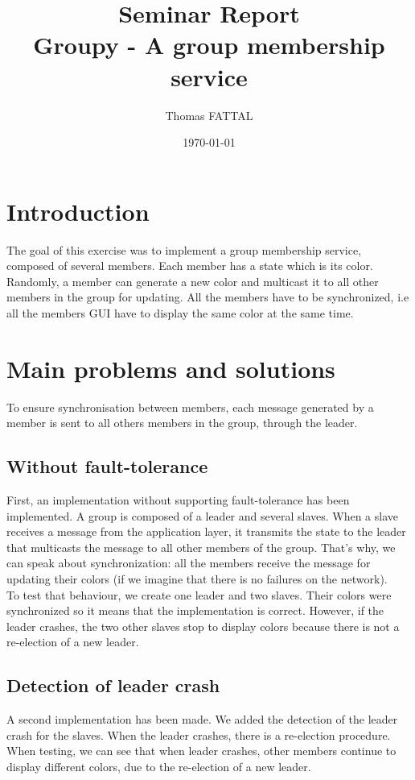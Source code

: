 \documentclass[a4paper, 11pt]{article}
\title{Seminar Report\\Groupy - A group membership service}
\author{Thomas FATTAL}
\date{\today{}}
\begin{document}
\maketitle

\section{Introduction}
The goal of this exercise was to implement a group membership service, composed of several members. Each member has a state which is its color. Randomly, a member can generate a new color and multicast it to all other members in the group for updating. All the members have to be synchronized, i.e all the members GUI have to display the same color at the same time. 

\section{Main problems and solutions}
To ensure synchronisation between members, each message generated by a member is sent to all others members in the group, through the leader.

\subsection{Without fault-tolerance}
First, an implementation without supporting fault-tolerance has been implemented. A group is composed of a leader and several slaves. When a slave receives a message from the application layer, it transmits the state to the leader that multicasts the message to all other members of the group. That's why, we can speak about synchronization: all the members receive the message for updating their colors (if we imagine that there is no failures on the network).\\

To test that behaviour, we create one leader and two slaves. Their colors were synchronized so it means that the implementation is correct. However, if the leader crashes, the two other slaves stop to display colors because there is not a re-election of a new leader.

\subsection{Detection of leader crash}
A second implementation has been made. We added the detection of the leader crash for the slaves. When the leader crashes, there is a re-election procedure. When testing, we can see that when leader crashes, other members continue to display different colors, due to the re-election of a new leader.\\
\end{document}
